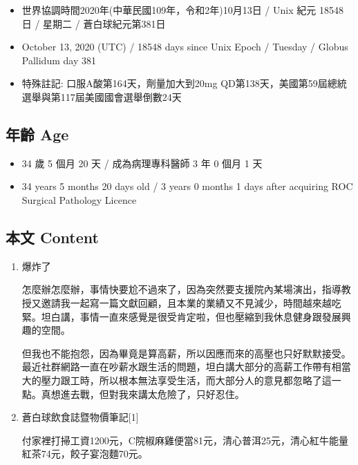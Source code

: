 \documentclass[a5paper, 11pt
]{book}
\providecommand{\tightlist}{%
  \setlength{\itemsep}{0pt}\setlength{\parskip}{0pt}}
\begin{document}
\begin{itemize}
\tightlist
\item
  世界協調時間2020年(中華民國109年，令和2年)10月13日 / Unix 紀元 18548
  日 / 星期二 / 蒼白球紀元第381日
\item
  October 13, 2020 (UTC) / 18548 days since Unix Epoch / Tuesday /
  Globus Pallidum day 381
\item
  特殊註記: 口服A酸第164天，劑量加大到20mg
  QD第138天，美國第59屆總統選舉與第117屆美國國會選舉倒數24天
\end{itemize}

\hypertarget{ux5e74ux9f61-age-39}{%
\subsection{年齡 Age}\label{ux5e74ux9f61-age-39}}

\begin{itemize}
\tightlist
\item
  34 歲 5 個月 20 天 / 成為病理專科醫師 3 年 0 個月 1 天
\item
  34 years 5 months 20 days old / 3 years 0 months 1 days after
  acquiring ROC Surgical Pathology Licence
\end{itemize}

\hypertarget{ux672cux6587-content-39}{%
\subsection{本文 Content}\label{ux672cux6587-content-39}}

\begin{enumerate}
\def\labelenumi{\arabic{enumi}.}
\item
  爆炸了

  怎麼辦怎麼辦，事情快要尬不過來了，因為突然要支援院內某場演出，指導教授又邀請我一起寫一篇文獻回顧，且本業的業績又不見減少，時間越來越吃緊。坦白講，事情一直來感覺是很受肯定啦，但也壓縮到我休息健身跟發展興趣的空間。

  但我也不能抱怨，因為畢竟是算高薪，所以因應而來的高壓也只好默默接受。最近社群網路一直在吵薪水跟生活的問題，坦白講大部分的高薪工作帶有相當大的壓力跟工時，所以根本無法享受生活，而大部分人的意見都忽略了這一點。真想進去戰，但對我來講太危險了，只好忍住。
\item
  蒼白球飲食誌暨物價筆記{[}1{]}

  付家裡打掃工資1200元，C院椒麻雞便當81元，清心普洱25元，清心紅牛能量紅茶74元，餃子宴泡麵70元。
\end{enumerate}
\end{document}
